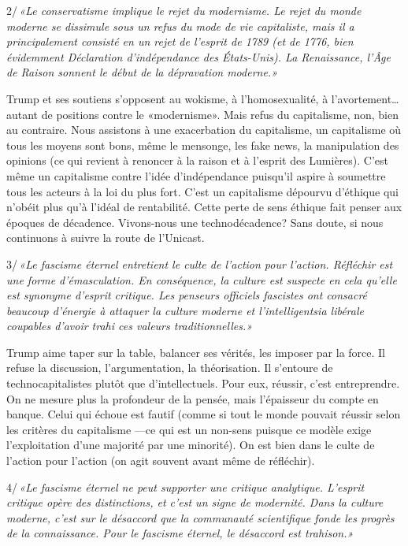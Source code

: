 \documentclass[a5paper, 10pt, twoside]{book}
\begin{document}
2/\,\emph{«Le conservatisme implique le rejet du modernisme. Le rejet du
monde moderne se dissimule sous un refus du mode de vie capitaliste,
mais il a principalement consisté en un rejet de l’esprit de 1789 (et de
1776, bien évidemment Déclaration d’indépendance des États-Unis). La
Renaissance, l’Âge de Raison sonnent le début de la dépravation
moderne.»}

Trump et ses soutiens s’opposent au wokisme, à l’homosexualité, à
l’avortement… autant de positions contre le «modernisme». Mais refus du
capitalisme, non, bien au contraire. Nous assistons à une exacerbation
du capitalisme, un capitalisme où tous les moyens sont bons, même le
mensonge, les fake news, la manipulation des opinions (ce qui revient à
renoncer à la raison et à l’esprit des Lumières). C’est même un
capitalisme contre l’idée d’indépendance puisqu’il aspire à soumettre
tous les acteurs à la loi du plus fort. C’est un capitalisme dépourvu
d’éthique qui n’obéit plus qu’à l’idéal de rentabilité. Cette perte de
sens éthique fait penser aux époques de décadence. Vivons-nous une
technodécadence? Sans doute, si nous continuons à suivre la route de
l’Unicast.

3/\,\emph{«Le fascisme éternel entretient le culte de l’action pour
l’action. Réfléchir est une forme d’émasculation. En conséquence, la
culture est suspecte en cela qu’elle est synonyme d’esprit critique. Les
penseurs officiels fascistes ont consacré beaucoup d’énergie à attaquer
la culture moderne et l’intelligentsia libérale coupables d’avoir trahi
ces valeurs traditionnelles.»}

Trump aime taper sur la table, balancer ses vérités, les imposer par la
force. Il refuse la discussion, l’argumentation, la théorisation. Il
s’entoure de technocapitalistes plutôt que d’intellectuels. Pour eux,
réussir, c’est entreprendre. On ne mesure plus la profondeur de la
pensée, mais l’épaisseur du compte en banque. Celui qui échoue est
fautif (comme si tout le monde pouvait réussir selon les critères du
capitalisme —ce qui est un non-sens puisque ce modèle exige
l’exploitation d’une majorité par une minorité). On est bien dans le
culte de l’action pour l’action (on agit souvent avant même de
réfléchir).

4/\,\emph{«Le fascisme éternel ne peut supporter une critique
analytique. L’esprit critique opère des distinctions, et c’est un signe
de modernité. Dans la culture moderne, c’est sur le désaccord que la
communauté scientifique fonde les progrès de la connaissance. Pour le
fascisme éternel, le désaccord est trahison.»}
\end{document}
